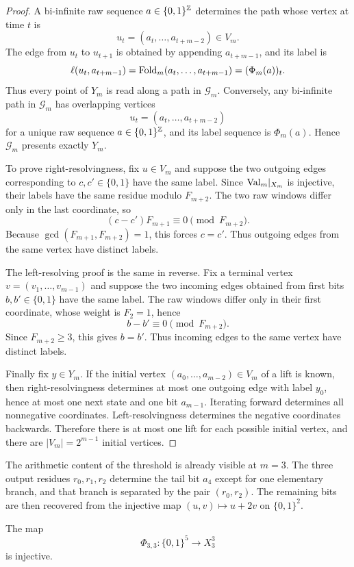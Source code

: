 \begin{proof}
A bi-infinite raw sequence $a\in\{0,1\}^{\mathbb{Z}}$ determines the path whose
vertex at time $t$ is
\[
u_t=(a_t,\ldots,a_{t+m-2})\in V_m.
\]
The edge from $u_t$ to $u_{t+1}$ is obtained by appending $a_{t+m-1}$, and its
label is
\[
\ell(u_t,a_{t+m-1})=\mathrm{Fold}_m(a_t,\ldots,a_{t+m-1})=(\Phi_m(a))_t.
\]
Thus every point of $Y_m$ is read along a path in $\mathcal G_m$.  Conversely,
any bi-infinite path in $\mathcal G_m$ has overlapping vertices
\[
u_t=(a_t,\ldots,a_{t+m-2})
\]
for a unique raw sequence $a\in\{0,1\}^{\mathbb{Z}}$, and its label sequence is
$\Phi_m(a)$.  Hence $\mathcal G_m$ presents exactly $Y_m$.

To prove right-resolvingness, fix $u\in V_m$ and suppose the two outgoing
edges corresponding to $c,c'\in\{0,1\}$ have the same label.  Since
$\mathrm{Val}_m|_{X_m}$ is injective, their labels have the same residue modulo
$F_{m+2}$.  The two raw windows differ only in the last coordinate, so
\[
(c-c')F_{m+1}\equiv0\pmod {F_{m+2}}.
\]
Because $\gcd(F_{m+1},F_{m+2})=1$, this forces $c=c'$.  Thus outgoing edges
from the same vertex have distinct labels.

The left-resolving proof is the same in reverse.  Fix a terminal vertex
$v=(v_1,\ldots,v_{m-1})$ and suppose the two incoming edges obtained from
first bits $b,b'\in\{0,1\}$ have the same label.  The raw windows differ only
in their first coordinate, whose weight is $F_2=1$, hence
\[
b-b'\equiv0\pmod {F_{m+2}}.
\]
Since $F_{m+2}\ge3$, this gives $b=b'$.  Thus incoming edges to the same
vertex have distinct labels.

Finally fix $y\in Y_m$.  If the initial vertex
$(a_0,\ldots,a_{m-2})\in V_m$ of a lift is known, then right-resolvingness
determines at most one outgoing edge with label $y_0$, hence at most one next
state and one bit $a_{m-1}$.  Iterating forward determines all nonnegative
coordinates.  Left-resolvingness determines the negative coordinates
backwards.  Therefore there is at most one lift for each possible initial
vertex, and there are $|V_m|=2^{m-1}$ initial vertices.
\end{proof}

The arithmetic content of the threshold is already visible at $m=3$. The three
output residues $r_0,r_1,r_2$ determine the tail bit $a_4$ except for one
elementary branch, and that branch is separated by the pair $(r_0,r_2)$. The
remaining bits are then recovered from the injective map $(u,v)\mapsto u+2v$
on $\{0,1\}^2$.

\begin{lemma}\label{lem:m3-decoder}
The map
\[
\Phi_{3,3}:\{0,1\}^{5}\longrightarrow X_3^3
\]
is injective.
\end{lemma}

